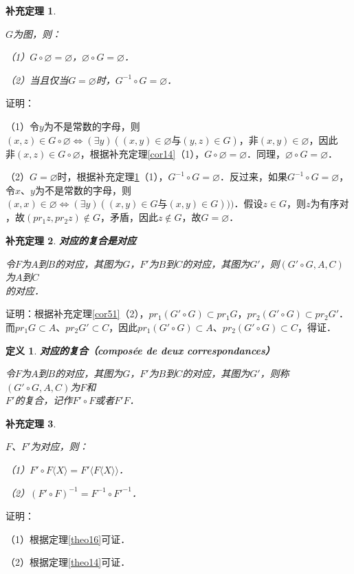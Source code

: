 \documentclass[12pt, a4paper, oneside]{book}
\newtheorem{cor}{补充定理}
\newtheorem{de}{定义}
\begin{document}
			\begin{cor}\label{cor52}
				\hfill\par
				$G$为图，则：
				\par
				（1）$G\circ \varnothing=\varnothing$，$\varnothing\circ G=\varnothing$．
				\par
				（2）当且仅当$G= \varnothing$时，$G^{-1}\circ G=\varnothing$．
			\end{cor}
			证明：
			\par
			（1）令$y$为不是常数的字母，则$(x, z)\in G\circ \varnothing\Leftrightarrow (\exists y)((x, y)\in \varnothing\text{与}(y, z)\in G)$，$\text{非}(x, y)\in \varnothing$，因此$\text{非}(x, z)\in G\circ \varnothing$，根据补充定理\ref{cor14}（1），$G\circ \varnothing=\varnothing$．同理，$\varnothing\circ G=\varnothing$．
			\par
			（2）$G= \varnothing$时，根据补充定理\ref{cor52}（1），$G^{-1}\circ G=\varnothing$．反过来，如果$G^{-1}\circ G=\varnothing$，令$x$、$y$为不是常数的字母，则$(x, x)\in \varnothing \Leftrightarrow (\exists y)((x, y)\in G\text{与}(x, y)\in G)))$．假设$z\in G$，则$z\text{为有序对}$，故$(pr_1z, pr_2z) \notin G$，矛盾，因此$z\notin G$，故$G=\varnothing$．
			\begin{cor}\label{cor53}
				\textbf{对应的复合是对应}
				\par
				令$F$为$A$到$B$的对应，其图为$G$，$F'$为$B$到$C$的对应，其图为$G'$，则$(G'\circ G, A, C)$为$A$到$C$\\的对应．
			\end{cor}
			证明：根据补充定理\ref{cor51}（2），$pr_1(G'\circ G)\subset pr_1G$，$pr_2(G'\circ G)\subset pr_2G'$．而$pr_1G\subset A$、$pr_2G'\subset C$，因此$pr_1(G'\circ G)\subset A$、$pr_2(G'\circ G)\subset C$，得证．

			\begin{de}
				\textbf{对应的复合（composée de deux correspondances）}
				\par
				令$F$为$A$到$B$的对应，其图为$G$，$F'$为$B$到$C$的对应，其图为$G'$，则称$(G'\circ G, A, C)$为$F$和\\$F'$的复合，记作$F'\circ F$或者$F'F$．
			\end{de}
		
			\begin{cor}\label{cor54}
				\hfill\par
				$F$、$F'$为对应，则：
				\par
				（1）$F'\circ F\langle X \rangle =F'\langle F\langle X \rangle \rangle$．
				\par
				（2）$(F'\circ F)^{-1}=F^{-1}\circ {F'}^{-1}$．
			\end{cor}
			证明：
			\par
			（1）根据定理\ref{theo16}可证．
			\par
			（2）根据定理\ref{theo14}可证．
			
\end{document}
